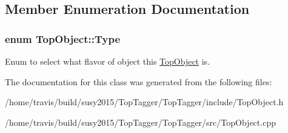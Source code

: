 \subsection{Member Enumeration Documentation}
\hypertarget{classTopObject_af82a20e421c29bc667af7cd73fc46ba4}{
\subsubsection[{Type}]{\setlength{\rightskip}{0pt plus 5cm}enum {\bf Top\-Object\-::\-Type}}}\label{classTopObject_af82a20e421c29bc667af7cd73fc46ba4}
Enum to select what flavor of object this \hyperlink{classTopObject}{Top\-Object} is. 

The documentation for this class was generated from the following files\-:\begin{DoxyCompactItemize}
\item 
/home/travis/build/susy2015/\-Top\-Tagger/\-Top\-Tagger/include/Top\-Object.\-h\item 
/home/travis/build/susy2015/\-Top\-Tagger/\-Top\-Tagger/src/Top\-Object.\-cpp\end{DoxyCompactItemize}
